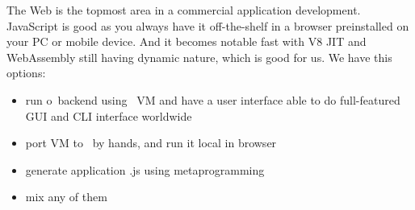 \clearpage{}\label{jsweb}\secdown

The Web is the topmost area in a commercial application development. JavaScript
is good as you always have it off-the-shelf in a browser preinstalled on your PC
or mobile device. And it becomes notable fast with V8 JIT and WebAssembly still
having dynamic nature, which is good for us. We have this options:
\begin{itemize}[nosep]
  \item run o\F\ backend using \py\ VM and have a user interface able
  to do full-featured GUI and CLI interface worldwide
  \item port VM to \js\ by hands, and run it local in browser
  \item generate application .js using metaprogramming
  \item mix any of them 
\end{itemize}
\clearpage

\secup
